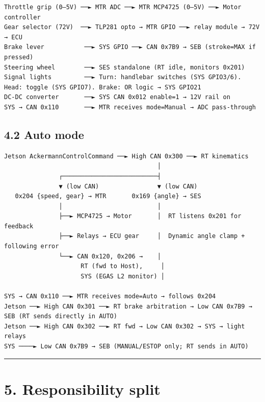 \begin{verbatim}
Throttle grip (0–5V) ──► MTR ADC ──► MTR MCP4725 (0–5V) ──► Motor controller
Gear selector (72V)  ──► TLP281 opto → MTR GPIO ──► relay module → 72V → ECU
Brake lever           ──► SYS GPIO ──► CAN 0x7B9 → SEB (stroke=MAX if pressed)
Steering wheel        ──► SES standalone (RT idle, monitors 0x201)
Signal lights         ──► Turn: handlebar switches (SYS GPIO3/6). Head: toggle (SYS GPIO7). Brake: OR logic → SYS GPIO21
DC-DC converter       ──► SYS CAN 0x012 enable=1 → 12V rail on
SYS → CAN 0x110       ──► MTR receives mode=Manual → ADC pass-through
\end{verbatim}

\subsection{4.2 Auto mode}\label{auto-mode}

\begin{verbatim}
Jetson AckermannControlCommand ──► High CAN 0x300 ──► RT kinematics
                                          │
               ┌──────────────────────────┤
               ▼ (low CAN)                ▼ (low CAN)
   0x204 {speed, gear} → MTR       0x169 {angle} → SES
               │                          │
               ├──► MCP4725 → Motor       │  RT listens 0x201 for feedback
               ├──► Relays → ECU gear     │  Dynamic angle clamp + following error
               └──► CAN 0x120, 0x206 →    │
                     RT (fwd to Host),     │
                     SYS (EGAS L2 monitor) │

SYS → CAN 0x110 ──► MTR receives mode=Auto → follows 0x204
Jetson ──► High CAN 0x301 ──► RT brake arbitration → Low CAN 0x7B9 → SEB (RT sends directly in AUTO)
Jetson ──► High CAN 0x302 ──► RT fwd → Low CAN 0x302 → SYS → light relays
SYS ────► Low CAN 0x7B9 → SEB (MANUAL/ESTOP only; RT sends in AUTO)
\end{verbatim}

\begin{center}\rule{0.5\linewidth}{0.5pt}\end{center}

\section{5. Responsibility split}\label{responsibility-split}

